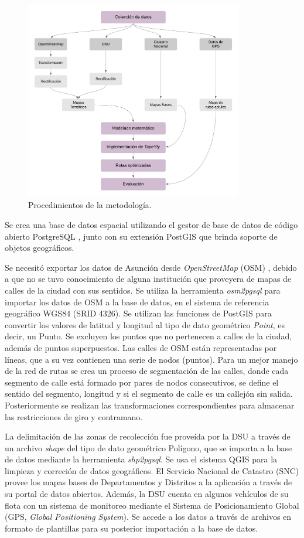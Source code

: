 \documentclass[conference]{IEEEtran}
\begin{document}
\begin{figure}[tbp]
\centerline{\includegraphics[width=9.5cm]{imagenes/DiagramaDeMetodologia.png}}
\caption{Procedimientos de la metodología.}
\label{fig:metodologia}
\end{figure}

Se crea una base de datos espacial utilizando el gestor de base de datos de código abierto PostgreSQL \cite{PostgreSQL}, junto con su extensión PostGIS \cite{PostGIS} que brinda soporte de objetos geográficos.

Se necesitó exportar los datos de Asunción desde \textit{OpenStreetMap} (OSM) \cite{OpenStreetMap}, debido a que no se tuvo conocimiento de alguna institución que proveyera de mapas de calles de la ciudad con sus sentidos. Se utiliza la herramienta \textit{osm2pgsql} para importar los datos de OSM a la base de datos, en el sistema de referencia geográfico WGS84 (SRID 4326). Se utilizan las funciones de PostGIS para convertir los valores de latitud y longitud al tipo de dato geométrico \textit{Point}, es decir, un Punto. Se excluyen los puntos que no pertenecen a calles de la ciudad, además de puntos superpuestos. Las calles de OSM están representadas por líneas, que a su vez contienen una serie de nodos (puntos). Para un mejor manejo de la red de rutas se crea un proceso de segmentación de las calles, donde cada segmento de calle está formado por pares de nodos consecutivos, se define el sentido del segmento, longitud y si el segmento de calle es un callejón sin salida. Posteriormente se realizan las transformaciones correspondientes para almacenar las restricciones de giro y contramano.

La delimitación de las zonas de recolección fue proveída por la DSU a través de un archivo \textit{shape} del tipo de dato geométrico Polígono, que se importa a la base de datos mediante la herramienta \textit{shp2pgsql}. Se usa el sistema QGIS \cite{QGISSite} para la limpieza y correción de datos geográficos. El Servicio Nacional de Catastro (SNC) \cite{SNC} provee los mapas bases de Departamentos y Distritos a la aplicación a través de su portal de datos abiertos. Además, la DSU cuenta en  algunos  vehículos  de  su  flota con un sistema de monitoreo mediante el Sistema de Posicionamiento Global (GPS, \textit{Global Positioning System}). Se accede a los datos a través de archivos en formato de plantillas para su posterior importación a la base de datos.
\end{document}
